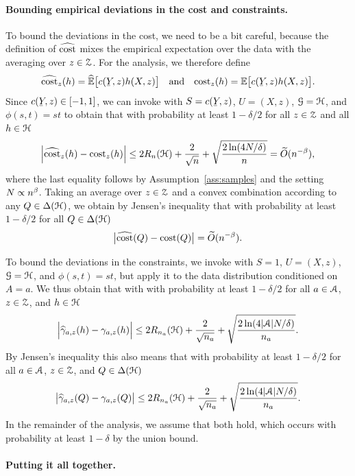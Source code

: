 \paragraph{Bounding empirical deviations in the cost and constraints.}
To bound the deviations in the cost, we need to be a bit careful, because the definition of $\widehat{\textup{\mdseries cost}}$ mixes
the empirical expectation over the data with the averaging over $z\in\mathcal{Z}$. For the analysis, we therefore
define
\[
   \hcost_z(h)=\Ehat\bigBracks{c(\underY,z)h(X,z)}
\quad
\text{and}
\quad
   \cost_z(h)=\E\bigBracks{c(\underY,z)h(X,z)}.
\]
Since $c(\underY,z)\in[-1,1]$, we can invoke  with $S=c(\underY,z)$, $U=(X,z)$, $\mathcal{G}=\mathcal{H}$, and $\phi(s,t)=st$ to obtain that with probability at least $1-\delta/2$ for all $z\in\mathcal{Z}$ and all $h\in\mathcal{H}$
\[
  \Bigl\lvert\widehat{\textup{\mdseries cost}}_z(h)-\textup{\mdseries cost}_z(h)\Bigr\rvert
  \le
  2R_n(\mathcal{H})+\frac{2}{\sqrt{n}}+\sqrt{\frac{2\ln(4N/\delta)}{n}}
  =
  \widetilde{O}(n^{-\beta})
,
\]
where the last equality follows by Assumption~\ref{ass:samples} and the setting $N\propto n^\beta$.
Taking an average over $z\in\mathcal{Z}$ and a convex combination according to any $Q\in\Delta(\mathcal{H})$, we obtain by Jensen's inequality
that with probability at least $1-\delta/2$ for all $Q\in\Delta(\mathcal{H})$
%
\begin{equation}
\label{eq:dev:cost}
  \bigl\lvert\widehat{\textup{\mdseries cost}}(Q)-\textup{\mdseries cost}(Q)\bigr\rvert
  =
  \widetilde{O}(n^{-\beta})
.
\end{equation}

To bound the deviations in the constraints, we invoke  with $S=1$, $U=(X,z)$, $\mathcal{G}=\mathcal{H}$, and $\phi(s,t)=st$, but apply it to the data distribution conditioned on $A=a$. We thus obtain that with with probability at least $1-\delta/2$ for all $a\in\mathcal{A}$, $z\in\mathcal{Z}$, and $h\in\mathcal{H}$
\[
  \Bigl\lvert\widehat{\gamma}_{a,z}(h)-\gamma_{a,z}(h)\Bigr\rvert
  \le
  2R_{n_a}(\mathcal{H})+\frac{2}{\sqrt{n_a}}+\sqrt{\frac{2\ln(4\lvert\mathcal{A}\rvert N/\delta)}{n_a}}
.
\]
By Jensen's inequality this also means
that with probability at least $1-\delta/2$ for all $a\in\mathcal{A}$, $z\in\mathcal{Z}$, and $Q\in\Delta(\mathcal{H})$
%
\begin{equation}
\label{eq:dev:gamma}
  \bigl\lvert\widehat{\gamma}_{a,z}(Q)-\gamma_{a,z}(Q)\bigr\rvert
  \le
  2R_{n_a}(\mathcal{H})+\frac{2}{\sqrt{n_a}}+\sqrt{\frac{2\ln(4\lvert\mathcal{A}\rvert N/\delta)}{n_a}}
.
\end{equation}
%
In the remainder of the analysis, we assume that  both hold, which occurs with probability at least $1-\delta$ by the union bound.

\paragraph{Putting it all together.}

